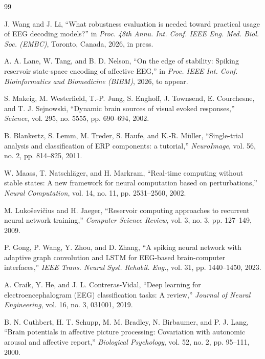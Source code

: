 \documentclass[journal]{IEEEtran}
\begin{document}
\begin{thebibliography}{99}

J. Wang and J. Li, ``What robustness evaluation is needed toward practical usage of EEG decoding models?'' in \emph{Proc. 48th Annu. Int. Conf. IEEE Eng. Med. Biol. Soc. (EMBC)}, Toronto, Canada, 2026, in press.

A. A. Lane, W. Tang, and B. D. Nelson, ``On the edge of stability: Spiking reservoir state-space encoding of affective EEG,'' in \emph{Proc. IEEE Int. Conf. Bioinformatics and Biomedicine (BIBM)}, 2026, to appear.

S. Makeig, M. Westerfield, T.-P. Jung, S. Enghoff, J. Townsend, E. Courchesne, and T. J. Sejnowski, ``Dynamic brain sources of visual evoked responses,'' \emph{Science}, vol. 295, no. 5555, pp. 690--694, 2002.

B. Blankertz, S. Lemm, M. Treder, S. Haufe, and K.-R. M\"uller, ``Single-trial analysis and classification of ERP components: a tutorial,'' \emph{NeuroImage}, vol. 56, no. 2, pp. 814--825, 2011.

W. Maass, T. Natschl\"ager, and H. Markram, ``Real-time computing without stable states: A new framework for neural computation based on perturbations,'' \emph{Neural Computation}, vol. 14, no. 11, pp. 2531--2560, 2002.

M. Luko\v{s}evi\v{c}ius and H. Jaeger, ``Reservoir computing approaches to recurrent neural network training,'' \emph{Computer Science Review}, vol. 3, no. 3, pp. 127--149, 2009.

P. Gong, P. Wang, Y. Zhou, and D. Zhang, ``A spiking neural network with adaptive graph convolution and LSTM for EEG-based brain-computer interfaces,'' \emph{IEEE Trans. Neural Syst. Rehabil. Eng.}, vol. 31, pp. 1440--1450, 2023.

A. Craik, Y. He, and J. L. Contreras-Vidal, ``Deep learning for electroencephalogram (EEG) classification tasks: A review,'' \emph{Journal of Neural Engineering}, vol. 16, no. 3, 031001, 2019.

B. N. Cuthbert, H. T. Schupp, M. M. Bradley, N. Birbaumer, and P. J. Lang, ``Brain potentials in affective picture processing: Covariation with autonomic arousal and affective report,'' \emph{Biological Psychology}, vol. 52, no. 2, pp. 95--111, 2000.


\end{thebibliography}
\end{document}
